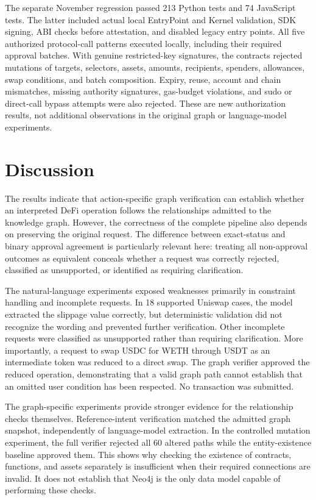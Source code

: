 The separate November regression passed 213 Python tests and 74 JavaScript
tests. The latter included actual local EntryPoint and Kernel validation,
SDK signing, ABI checks before attestation, and disabled legacy entry points.
All five authorized protocol-call patterns executed locally, including
their required approval batches. With genuine restricted-key signatures,
the contracts rejected mutations of targets, selectors, assets, amounts,
recipients, spenders, allowances, swap conditions, and batch composition.
Expiry, reuse, account and chain mismatches, missing authority signatures,
gas-budget violations, and sudo or direct-call bypass attempts were also
rejected. These are new authorization results, not additional observations
in the original graph or language-model experiments.



\section{Discussion}
\label{sec:evaluation_discussion}

The results indicate that action-specific graph verification can establish
whether an interpreted DeFi operation follows the relationships admitted to
the knowledge graph. However, the correctness of the complete pipeline also
depends on preserving the original request. The difference between exact-status
and binary approval agreement is particularly relevant here: treating all
non-approval outcomes as equivalent conceals whether a request was correctly
rejected, classified as unsupported, or identified as requiring clarification.

The natural-language experiments exposed weaknesses primarily in constraint
handling and incomplete requests. In 18 supported Uniswap cases, the model
extracted the slippage value correctly, but deterministic validation did not
recognize the wording and prevented further verification. Other incomplete
requests were classified as unsupported rather than requiring clarification.
More importantly, a request to swap USDC for WETH through USDT as an
intermediate token was reduced to a direct swap. The graph verifier approved
the reduced operation, demonstrating that a valid graph path cannot establish
that an omitted user condition has been respected. No transaction was submitted.

The graph-specific experiments provide stronger evidence for the relationship
checks themselves. Reference-intent verification matched the admitted graph
snapshot, independently of language-model extraction. In the controlled
mutation experiment, the full verifier rejected all 60 altered paths while
the entity-existence baseline approved them. This shows why checking the
existence of contracts, functions, and assets separately is insufficient
when their required connections are invalid. It does not establish that
Neo4j is the only data model capable of performing these checks.

